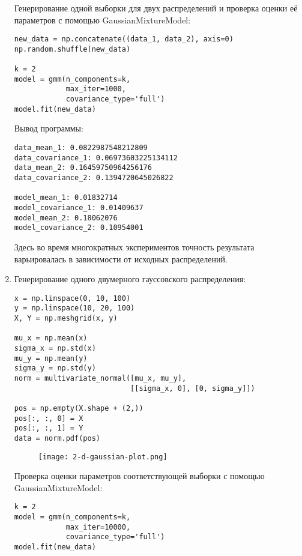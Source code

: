 \begin{enumerate}
{        Генерирование одной выборки для двух распределений и проверка оценки её параметров с помощью GaussianMixtureModel:
        \begin{verbatim}
new_data = np.concatenate((data_1, data_2), axis=0)
np.random.shuffle(new_data)

k = 2
model = gmm(n_components=k,
            max_iter=1000,
            covariance_type='full')
model.fit(new_data)
        \end{verbatim}
        Вывод программы:
        \begin{verbatim}
data_mean_1: 0.0822987548212809
data_covariance_1: 0.06973603225134112
data_mean_2: 0.16459750964256176
data_covariance_2: 0.1394720645026822

model_mean_1: 0.01832714
model_covariance_1: 0.01409637
model_mean_2: 0.18062076
model_covariance_2: 0.10954001
        \end{verbatim}
        Здесь во время многократных экспериментов точность результата варьировалась в зависимости от исходных распределений.
    }
    \item {
        Генерирование одного двумерного гауссовского распределения:

        \begin{verbatim}
x = np.linspace(0, 10, 100)
y = np.linspace(10, 20, 100)
X, Y = np.meshgrid(x, y)

mu_x = np.mean(x)
sigma_x = np.std(x)
mu_y = np.mean(y)
sigma_y = np.std(y)
norm = multivariate_normal([mu_x, mu_y],
                           [[sigma_x, 0], [0, sigma_y]])

pos = np.empty(X.shape + (2,))
pos[:, :, 0] = X
pos[:, :, 1] = Y
data = norm.pdf(pos)
        \end{verbatim}
        \begin{figure}[h]
            \begin{center}
                \texttt{[image: 2-d-gaussian-plot.png]}
                \caption{}
                \label{ris:experimcoded}
            \end{center}
        \end{figure}

        Проверка оценки параметров соответствующей выборки с помощью GaussianMixtureModel:
        \begin{verbatim}
k = 2
model = gmm(n_components=k,
            max_iter=10000,
            covariance_type='full')
model.fit(new_data)
        \end{verbatim}

}
\end{enumerate}

